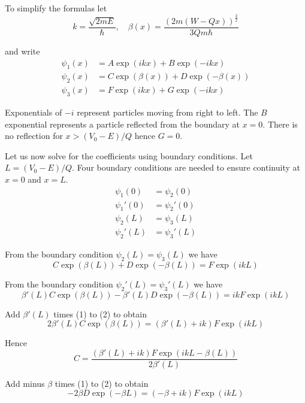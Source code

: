 To simplify the formulas let
\begin{equation*}
k=\frac{\sqrt{2mE}}{\hbar},\quad\beta(x)=\frac{(2m(W-Qx))^\frac{3}{2}}{3Qm\hbar}
\end{equation*}

and write
\begin{align*}
\psi_1(x)&=A\exp(ikx)+B\exp(-ikx)
\\
\psi_2(x)&=C\exp(\beta(x))+D\exp(-\beta(x))
\\
\psi_3(x)&=F\exp(ikx)+G\exp(-ikx)
\end{align*}

Exponentials of $-i$ represent particles moving from right to left.
The $B$ exponential represents a particle reflected from the
boundary at $x=0$.
There is no reflection for $x>(V_0-E)/Q$ hence $G=0$.

\bigskip
Let us now solve for the coefficients using boundary conditions.
Let $L=(V_0-E)/Q$.
Four boundary conditions are needed to ensure continuity
at $x=0$ and $x=L$.
\begin{align*}
\psi_1(0)&=\psi_2(0)
\\
\psi_1'(0)&=\psi_2'(0)
\\
\psi_2(L)&=\psi_3(L)
\\
\psi_2'(L)&=\psi_3'(L)
\end{align*}

From the boundary condition $\psi_2(L)=\psi_3(L)$ we have
\begin{equation*}
C\exp(\beta(L))+D\exp(-\beta(L))=F\exp(ikL)
\tag{1}
\end{equation*}

From the boundary condition $\psi_2'(L)=\psi_3'(L)$ we have
\begin{equation*}
\beta'(L) C\exp(\beta(L))-\beta'(L) D\exp(-\beta(L))
=ikF\exp(ikL)
\tag{2}
\end{equation*}

Add $\beta'(L)$ times (1) to (2) to obtain
\begin{equation*}
2\beta'(L)C\exp(\beta(L))=(\beta'(L)+ik)F\exp(ikL)
\end{equation*}

Hence
\begin{equation*}
C=\frac{(\beta'(L)+ik)F\exp(ikL-\beta(L))}{2\beta'(L)}
\tag{3}
\end{equation*}



Add minus $\beta$ times (1) to (2) to obtain
\begin{equation*}
-2\beta D\exp(-\beta L)=(-\beta+ik)F\exp(ikL)
\end{equation*}


